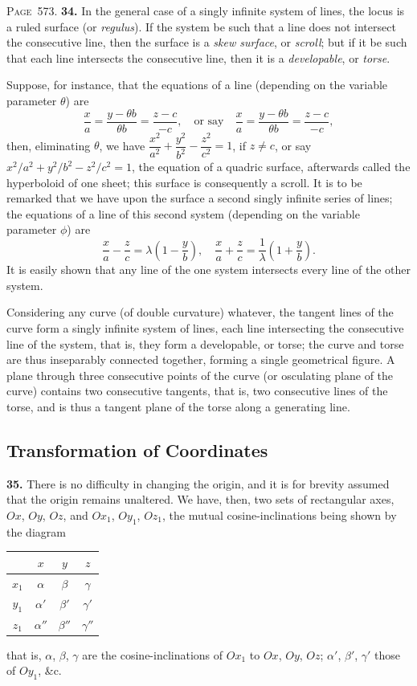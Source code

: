 \documentclass[11pt,a4paper]{article}
\theoremstyle{definition}
\begin{document}
\newpage
\noindent\textsc{Page~573.} \textbf{34.} In the general case of a singly infinite system of lines, the locus is a ruled surface (or \textit{regulus}). If the system be such that a line does not intersect the consecutive line, then the surface is a \textit{skew surface}, or \textit{scroll}; but if it be such that each line intersects the consecutive line, then it is a \textit{developable}, or \textit{torse}.

Suppose, for instance, that the equations of a line (depending on the variable parameter $\theta$) are
\[
\frac{x}{a}=\frac{y-\theta b}{\theta b}=\frac{z-c}{-c},\quad\text{or say}\quad
\frac{x}{a}=\frac{y-\theta b}{\theta b}=\frac{z-c}{-c},
\]
then, eliminating $\theta$, we have $\dfrac{x^2}{a^2}+\dfrac{y^2}{b^2}-\dfrac{z^2}{c^2}=1$, if $z\neq c$, or say $x^2/a^2+y^2/b^2-z^2/c^2=1$, the equation of a quadric surface, afterwards called the hyperboloid of one sheet; this surface is consequently a scroll. It is to be remarked that we have upon the surface a second singly infinite series of lines; the equations of a line of this second system (depending on the variable parameter $\phi$) are
\[
\frac{x}{a}-\frac{z}{c}=\lambda\left(1-\frac{y}{b}\right),\quad
\frac{x}{a}+\frac{z}{c}=\frac{1}{\lambda}\left(1+\frac{y}{b}\right).
\]
It is easily shown that any line of the one system intersects every line of the other system.

Considering any curve (of double curvature) whatever, the tangent lines of the curve form a singly infinite system of lines, each line intersecting the consecutive line of the system, that is, they form a developable, or torse; the curve and torse are thus inseparably connected together, forming a single geometrical figure. A plane through three consecutive points of the curve (or osculating plane of the curve) contains two consecutive tangents, that is, two consecutive lines of the torse, and is thus a tangent plane of the torse along a generating line.

\subsection*{Transformation of Coordinates}

\textbf{35.} There is no difficulty in changing the origin, and it is for brevity assumed that the origin remains unaltered. We have, then, two sets of rectangular axes, $Ox$, $Oy$, $Oz$, and $Ox_1$, $Oy_1$, $Oz_1$, the mutual cosine-inclinations being shown by the diagram
\begin{center}
\begin{tabular}{c|ccc}
& $x$ & $y$ & $z$ \\
\hline
$x_1$ & $\alpha$ & $\beta$ & $\gamma$ \\
$y_1$ & $\alpha'$ & $\beta'$ & $\gamma'$ \\
$z_1$ & $\alpha''$ & $\beta''$ & $\gamma''$ \\
\end{tabular}
\end{center}
that is, $\alpha$, $\beta$, $\gamma$ are the cosine-inclinations of $Ox_1$ to $Ox$, $Oy$, $Oz$; $\alpha'$, $\beta'$, $\gamma'$ those of $Oy_1$, \&c.
\end{document}
